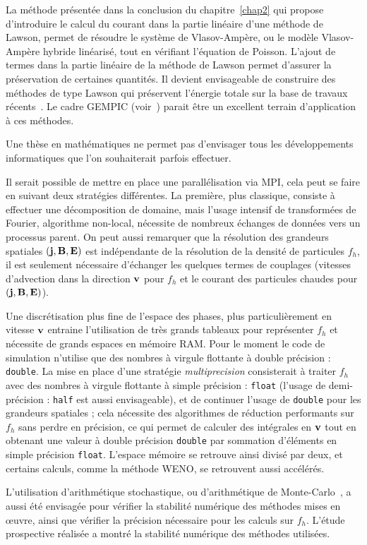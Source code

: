 La méthode présentée dans la conclusion du chapitre~\ref{chap2} qui propose d'introduire le calcul du courant dans la partie linéaire d'une méthode de Lawson, permet de résoudre le système de Vlasov-Ampère, ou le modèle Vlasov-Ampère hybride linéarisé, tout en vérifiant l'équation de Poisson. L'ajout de termes dans la partie linéaire de la méthode de Lawson permet d'assurer la préservation de certaines quantités. Il devient envisageable de construire des méthodes de type Lawson qui préservent l'énergie totale sur la base de travaux récents~\cite{Mei:2021}. Le cadre GEMPIC (voir~\cite{Kormann:2021}) parait être un excellent terrain d'application à ces méthodes.


Une thèse en mathématiques ne permet pas d'envisager tous les développements informatiques que l'on souhaiterait parfois effectuer.

Il serait possible de mettre en place une parallélisation via MPI, cela peut se faire en suivant deux stratégies différentes. La première, plus classique, consiste à effectuer une décomposition de domaine, mais l'usage intensif de transformées de Fourier, algorithme non-local, nécessite de nombreux échanges de données vers un processus parent. On peut aussi remarquer que la résolution des grandeurs spatiales $(\vb{j},\vb{B},\vb{E})$ est indépendante de la résolution de la densité de particules $f_h$, il est seulement nécessaire d'échanger les quelques termes de couplages (vitesses d'advection dans la direction $\vb{v}$ pour $f_h$ et le courant des particules chaudes pour $(\vb{j},\vb{B},\vb{E})$).

Une discrétisation plus fine de l'espace des phases, plus particulièrement en vitesse $\vb{v}$ entraine l'utilisation de très grands tableaux pour représenter $f_h$ et nécessite de grands espaces en mémoire RAM. Pour le moment le code de simulation n'utilise que des nombres à virgule flottante à double précision : \texttt{double}. La mise en place d'une stratégie \emph{multiprecision} consisterait à traiter $f_h$ avec des nombres à virgule flottante à simple précision : \texttt{float} (l'usage de demi-précision : \texttt{half} est aussi envisageable), et de continuer l'usage de \texttt{double} pour les grandeurs spatiales ; cela nécessite des algorithmes de réduction performants sur $f_h$ sans perdre en précision, ce qui permet de calculer des intégrales en $\vb{v}$ tout en obtenant une valeur à double précision \texttt{double} par sommation d'éléments en simple précision \texttt{float}. L'espace mémoire se retrouve ainsi divisé par deux, et certains calculs, comme la méthode WENO, se retrouvent aussi accélérés.

L'utilisation d'arithmétique stochastique, ou d'arithmétique de Monte-Carlo~\cite{Parker:1997,Parker:1997a}, a aussi été envisagée pour vérifier la stabilité numérique des méthodes mises en œuvre, ainsi que vérifier la précision nécessaire pour les calculs sur $f_h$. L'étude prospective réalisée a montré la stabilité numérique des méthodes utilisées.
